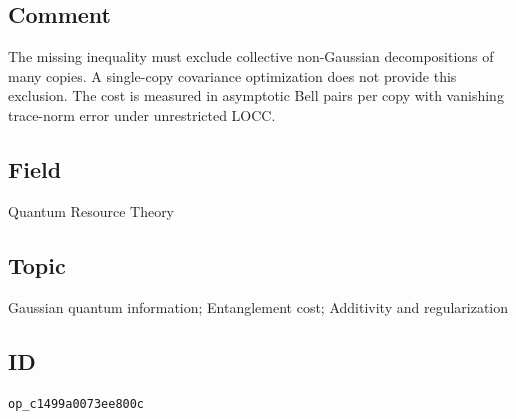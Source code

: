 \subsection*{Comment}

The missing inequality must exclude collective non-Gaussian decompositions of many copies. A single-copy covariance optimization does not provide this exclusion. The cost is measured in asymptotic Bell pairs per copy with vanishing trace-norm error under unrestricted LOCC.

\subsection*{Field}

Quantum Resource Theory

\subsection*{Topic}

Gaussian quantum information; Entanglement cost; Additivity and regularization

\subsection*{ID}

\texttt{op\_c1499a0073ee800c}
